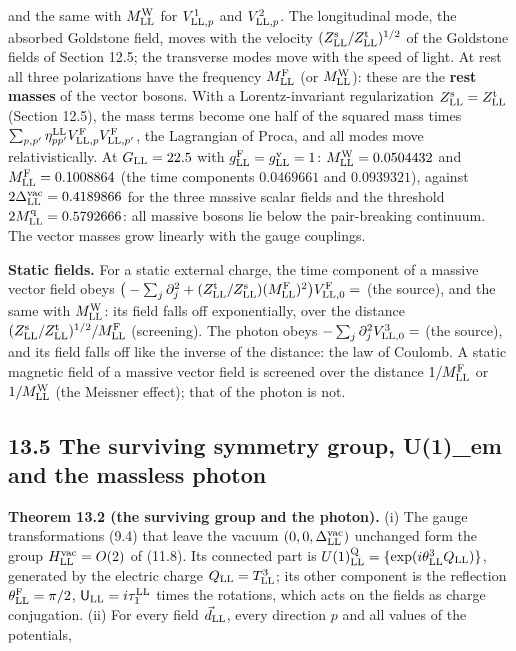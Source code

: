 \documentclass[
  10pt,
]{article}
\begin{document}
and the same with \(M^{\rm W}_{\rm LL}\) for \(V^1_{{\rm LL},p}\) and
\(V^2_{{\rm LL},p}\). The longitudinal mode, the absorbed Goldstone
field, moves with the velocity
\((Z^{\rm s}_{\rm LL}/Z^{\rm t}_{\rm LL})^{1/2}\) of the Goldstone
fields of Section 12.5; the transverse modes move with the speed of
light. At rest all three polarizations have the frequency
\(M^{\rm F}_{\rm LL}\) (or \(M^{\rm W}_{\rm LL}\)): these are the
\textbf{rest masses} of the vector bosons. With a Lorentz-invariant
regularization \(Z^{\rm s}_{\rm LL}=Z^{\rm t}_{\rm LL}\) (Section 12.5),
the mass terms become one half of the squared mass times
\(\sum_{p,p'}\eta^{\rm LL}_{pp'}V^{\rm F}_{{\rm LL},p}V^{\rm F}_{{\rm LL},p'}\),
the Lagrangian of Proca, and all modes move relativistically. At
\(G_{\rm LL}=22.5\) with \(g^{\rm F}_{\rm LL}=g^{\rm v}_{\rm LL}=1\):
\(M^{\rm W}_{\rm LL}=0.0504432\) and \(M^{\rm F}_{\rm LL}=0.1008864\)
(the time components \(0.0469661\) and \(0.0939321\)), against
\(2\Delta^{\rm vac}_{\rm LL}=0.4189866\) for the three massive scalar
fields and the threshold \(2M^{\rm q}_{\rm LL}=0.5792666\): all massive
bosons lie below the pair-breaking continuum. The vector masses grow
linearly with the gauge couplings.

\textbf{Static fields.} For a static external charge, the time component
of a massive vector field obeys
\(\big(-\sum_j\partial_j^2+(Z^{\rm t}_{\rm LL}/Z^{\rm s}_{\rm LL})(M^{\rm F}_{\rm LL})^2\big)V^{\rm F}_{{\rm LL},0}=\)
(the source), and the same with \(M^{\rm W}_{\rm LL}\): its field falls
off exponentially, over the distance
\((Z^{\rm s}_{\rm LL}/Z^{\rm t}_{\rm LL})^{1/2}/M^{\rm F}_{\rm LL}\)
(screening). The photon obeys \(-\sum_j\partial_j^2V^3_{{\rm LL},0}=\)
(the source), and its field falls off like the inverse of the distance:
the law of Coulomb. A static magnetic field of a massive vector field is
screened over the distance \(1/M^{\rm F}_{\rm LL}\) or
\(1/M^{\rm W}_{\rm LL}\) (the Meissner effect); that of the photon is
not.

\hypertarget{the-surviving-symmetry-group-u1_em-and-the-massless-photon}{%
\subsection{13.5 The surviving symmetry group, U(1)\_em and the massless
photon}\label{the-surviving-symmetry-group-u1_em-and-the-massless-photon}}

\textbf{Theorem 13.2 (the surviving group and the photon).} (i) The
gauge transformations (9.4) that leave the vacuum
\((0,0,\Delta^{\rm vac}_{\rm LL})\) unchanged form the group
\(H^{\rm vac}_{\rm LL}=O(2)\) of (11.8). Its connected part is
\(U(1)^{\rm Q}_{\rm LL}=\{\exp(i\theta^3_{\rm LL}Q_{\rm LL})\}\),
generated by the electric charge \(Q_{\rm LL}=T^3_{\rm LL}\); its other
component is the reflection \(\theta^{\rm F}_{\rm LL}=\pi/2\),
\(\mathsf U_{\rm LL}=i\tau^{\rm LL}_1\) times the rotations, which acts
on the fields as charge conjugation. (ii) For every field
\(\vec d_{\rm LL}\), every direction \(p\) and all values of the
potentials,
\end{document}
